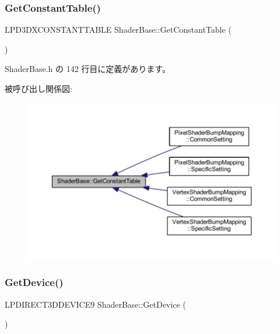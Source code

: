 \subsubsection{\texorpdfstring{Get\+Constant\+Table()}{GetConstantTable()}}
{\footnotesize\ttfamily L\+P\+D3\+D\+X\+C\+O\+N\+S\+T\+A\+N\+T\+T\+A\+B\+LE Shader\+Base\+::\+Get\+Constant\+Table (\begin{DoxyParamCaption}{ }\end{DoxyParamCaption})\hspace{0.3cm}{\ttfamily [inline]}}



 Shader\+Base.\+h の 142 行目に定義があります。

被呼び出し関係図\+:\nopagebreak
\begin{figure}[H]
\begin{center}
\leavevmode
\includegraphics[width=350pt]{class_shader_base_a85a5c17b56b6ffa29f7784ab42696d7c_icgraph}
\end{center}
\end{figure}
\mbox{\label{class_shader_base_a4601ff3d20f01800ffd676d3db8d9289}} 
\subsubsection{\texorpdfstring{Get\+Device()}{GetDevice()}}
{\footnotesize\ttfamily L\+P\+D\+I\+R\+E\+C\+T3\+D\+D\+E\+V\+I\+C\+E9 Shader\+Base\+::\+Get\+Device (\begin{DoxyParamCaption}{ }\end{DoxyParamCaption})\hspace{0.3cm}{\ttfamily [inline]}}



